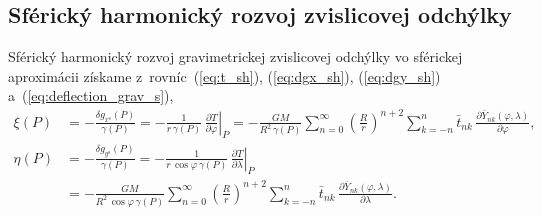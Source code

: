 \documentclass[a4paper,12pt]{book}
\begin{document}
\subsection{Sférický harmonický rozvoj zvislicovej odchýlky}

Sférický harmonický rozvoj gravimetrickej zvislicovej odchýlky vo sférickej 
aproximácii získame z~rovníc~(\ref{eq:t_sh}), (\ref{eq:dgx_sh}), 
(\ref{eq:dgy_sh}) a~(\ref{eq:deflection_grav_s}),
%
\begin{equation}
\label{eq:deflection_grav_s_sph}
\begin{split}
\xi(P) &= -\frac{\delta g_{x^\mathrm{s}}(P)}{\gamma(P)} = -\frac{1}{r \, 
\gamma(P)} \, \left.\frac{\partial T}{\partial \varphi}\right|_P 
= -\frac{GM}{R^2 \, \gamma(P)} \sum_{n = 0}^\infty \left( \frac{R}{r} 
\right)^{n + 2} \sum_{k = -n}^{n} \bar{t}_{nk} \, \frac{\partial 
\bar{Y}_{nk}(\varphi, \lambda)}{\partial \varphi}{,}\\
%
\eta(P) &= -\frac{\delta g_{y^\mathrm{s}}(P)}{\gamma(P)} = -\left.\frac{1}{r \, 
\cos\varphi \,\gamma(P)} \, \frac{\partial T}{\partial \lambda}\right|_P\\
%
&= - \frac{GM}{R^2 \, \cos\varphi \, \gamma(P)} \sum_{n = 0}^\infty \left( 
\frac{R}{r} \right)^{n + 2} \sum_{k = -n}^{n}\bar{t}_{nk} \, \frac{\partial 
\bar{Y}_{nk}(\varphi, \lambda)}{\partial \lambda}{.}\\
\end{split}
\end{equation}
\end{document}
